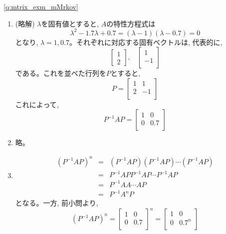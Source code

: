 \ref{q:mtrix_exm_mMrkov}
\begin{enumerate}
\item (略解) $\lambda$を固有値とすると, $A$の特性方程式は
\begin{equation*}
\lambda^2-1.7\lambda+0.7=(\lambda-1)(\lambda-0.7)=0
\end{equation*}
となり, $\lambda=1, 0.7$。それぞれに対応する固有ベクトルは, 代表的に, 
\begin{equation*}
\begin{bmatrix}
1\\
2
\end{bmatrix},\,\,\,\,\,
\begin{bmatrix}
1\\
-1\\
\end{bmatrix}
\end{equation*}
である。これを並べた行列を$P$とすると, 
\begin{equation}
P=\begin{bmatrix}
1 & 1\\
2 & -1\\
\end{bmatrix}
\end{equation}
これによって, 
\begin{equation}
P^{-1}AP=\begin{bmatrix}
1 & 0\\
0 & 0.7\\
\end{bmatrix}
\end{equation}
\item 略。
\item
\begin{eqnarray*}
(P^{-1}AP)^n&=&(P^{-1}AP)(P^{-1}AP)\cdots(P^{-1}AP)\\
&=&P^{-1}APP^{-1}AP\cdots P^{-1}AP\\
&=&P^{-1}AA\cdots AP\\
&=&P^{-1}A^nP
\end{eqnarray*}
となる。一方, 前小問より, 
\begin{equation}
(P^{-1}AP)^n=\begin{bmatrix}
1 & 0\\
0 & 0.7\\
\end{bmatrix}^n
=\begin{bmatrix}
1 & 0\\
0 & 0.7^n\\
\end{bmatrix}

\end{equation}
\end{enumerate}
